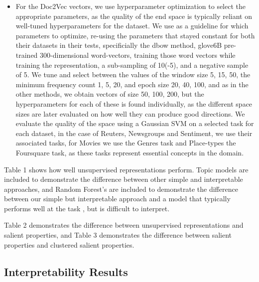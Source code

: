 \begin{itemize}
	\item For the Doc2Vec vectors, we use hyperparameter optimization to select the appropriate parameters, as the quality of the end space is typically reliant on well-tuned hyperparameters for the dataset. We use \cite{Lau2014} as a guideline for which parameters to optimize, re-using the parameters that stayed constant for both their datasets in their tests, specificially the dbow method, glove6B pre-trained 300-dimensional word-vectors, training those word vectors while training the representation, a sub-sampling of 10(-5), and a negative sample of 5. We tune and select between the values of the window size {5, 15, 50}, the minimum frequency count {1, 5, 20}, and epoch size {20, 40, 100}, and as in the other methods, we obtain vectors of size {50, 100, 200}, but the hyperparameters for each of these is found individually, as the different space sizes are later evaluated on how well they can produce good directions. We evaluate the quality of the space using a Gaussian SVM on a selected task for each dataset, in the case of Reuters, Newsgroups and Sentiment, we use their associated tasks, for Movies we use the Genres task and Place-types the Foursquare task, as these tasks represent essential concepts in the domain. 
	
	
\end{itemize}

Table 1 shows how well unsupervised representations perform. Topic models are included to demonstrate the difference between other simple and interpretable approaches, and Random Forest's are included to demonstrate the difference between our simple but interpretable approach and a model that typically performs well at the task \cite{Fern2014}, but is  difficult to interpret.

Table 2 demonstrates the difference between unsupervised representations and salient properties, and Table 3 demonstrates the difference between salient properties and clustered salient properties.
\subsection{Interpretability Results}

